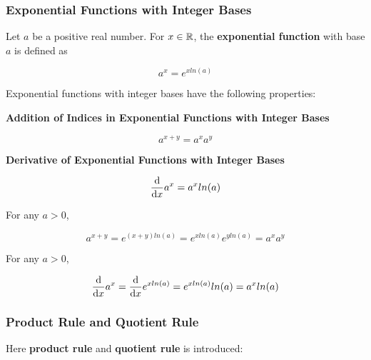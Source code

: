 \documentclass[a4paper,12pt]{article}
\begin{document}
\subsubsection{Exponential Functions with Integer Bases}
\begin{dft}
  Let $a$ be a positive real number. For $x\in\mathbb{R}$, the \textbf{exponential function} with base $a$ is defined as

  $$a^{x}=e^{xln(a)}$$
\end{dft}\n

\begin{thm}
  Exponential functions with integer bases have the following properties:

  \begin{alist}
    \item \textbf{Addition of Indices in Exponential Functions with Integer Bases}

    $$a^{x+y}=a^{x}a^{y}$$

    \item \textbf{Derivative of Exponential Functions with Integer Bases}

    $$\frac{\mathrm{d} }{\mathrm{d}  x}a^{x}=a^{x}ln(a)$$
  \end{alist}

   For any $a>0$,

  $$a^{x+y}=e^{(x+y)ln(a)}=e^{xln(a)}e^{yln(a)}=a^{x}a^{y}$$\s

   For any $a>0$,

  $$\frac{\mathrm{d} }{\mathrm{d}  x}a^{x}=\frac{\mathrm{d} }{\mathrm{d}  x}e^{xln(a)}=e^{xln(a)}ln(a)=a^{x}ln(a)$$
\end{thm}

\subsubsection{Product Rule and Quotient Rule}
Here \textbf{product rule} and \textbf{quotient rule} is introduced:\n
\end{document}
